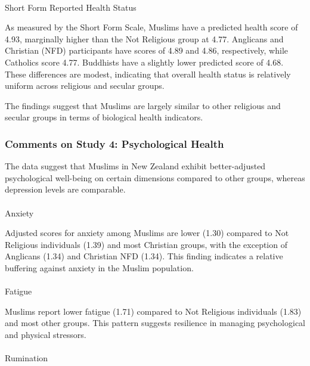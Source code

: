 \documentclass[
  single column]{article}
\makeatletter
\let\oldparagraph\paragraph
\renewcommand{\paragraph}{
    \@ifstar
      \xxxParagraphStar
      \xxxParagraphNoStar
  }
\newcommand{\xxxParagraphStar}[1]{\oldparagraph*{#1}\mbox{}}
\newcommand{\xxxParagraphNoStar}[1]{\oldparagraph{#1}\mbox{}}
\makeatother
\begin{document}
\paragraph{Short Form Reported Health
Status}\label{short-form-reported-health-status}

As measured by the Short Form Scale, Muslims have a predicted health
score of 4.93, marginally higher than the Not Religious group at 4.77.
Anglicans and Christian (NFD) participants have scores of 4.89 and 4.86,
respectively, while Catholics score 4.77. Buddhists have a slightly
lower predicted score of 4.68. These differences are modest, indicating
that overall health status is relatively uniform across religious and
secular groups.

The findings suggest that Muslims are largely similar to other religious
and secular groups in terms of biological health indicators.

\subsubsection{Comments on Study 4: Psychological
Health}\label{comments-on-study-4-psychological-health}

The data suggest that Muslims in New Zealand exhibit better-adjusted
psychological well-being on certain dimensions compared to other groups,
whereas depression levels are comparable.

\paragraph{Anxiety}\label{anxiety}

Adjusted scores for anxiety among Muslims are lower (1.30) compared to
Not Religious individuals (1.39) and most Christian groups, with the
exception of Anglicans (1.34) and Christian NFD (1.34). This finding
indicates a relative buffering against anxiety in the Muslim population.

\paragraph{Fatigue}\label{fatigue}

Muslims report lower fatigue (1.71) compared to Not Religious
individuals (1.83) and most other groups. This pattern suggests
resilience in managing psychological and physical stressors.

\paragraph{Rumination}\label{rumination}
\end{document}
